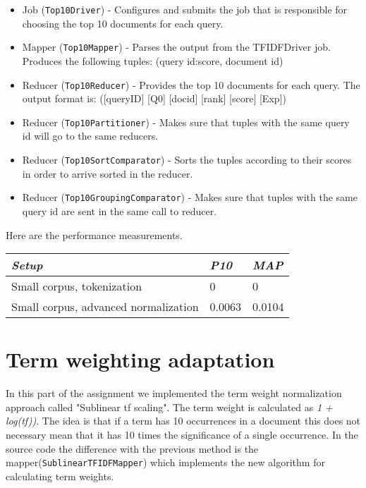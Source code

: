 \documentclass[a4paper, notitlepage]{article}
\begin{document}
\begin{itemize}
	\item Job (\lstinline{Top10Driver}) - Configures and submits the job that is responsible for choosing the top 10 documents for each query.
	\item Mapper (\lstinline{Top10Mapper}) - Parses the output from the TFIDFDriver job. Produces the following tuples: (query id:score, document id)
	\item Reducer (\lstinline{Top10Reducer}) - Provides the top 10 documents for each query. The output format is: ([queryID] [Q0] [docid] [rank] [score] [Exp])
  
	\item Reducer (\lstinline{Top10Partitioner}) - Makes sure that tuples with the same query id will go to the same reducers.
	
	\item Reducer (\lstinline{Top10SortComparator}) - Sorts the tuples according to their scores in order to arrive sorted in the reducer.
	
	\item Reducer (\lstinline{Top10GroupingComparator}) - Makes sure that tuples with the same query id are sent in the same call to reducer.
	
\end{itemize}

Here are the performance measurements.

\begin{center}
	\begin{tabular}{ | l | l | l |}\hline \emph{Setup} & \emph{P10} & \emph{MAP}\\ \hline
    Small corpus, tokenization & 0 & 0 \\ \hline
    Small corpus, advanced normalization & 0.0063 & 0.0104 \\ \hline
    \end{tabular}
\end{center}

\section{Term weighting adaptation}
In this part of the assignment we implemented the term weight normalization approach called "Sublinear tf scaling". The term weight is calculated as \emph{1 + log(tf))}. The idea is that if a term has 10 occurrences in a document this does not necessary mean that it has 10 times the significance of a single occurrence. In the source code the difference with the previous method is the mapper(\lstinline{SublinearTFIDFMapper}) which implements the new algorithm for calculating term weights.
\end{document}

